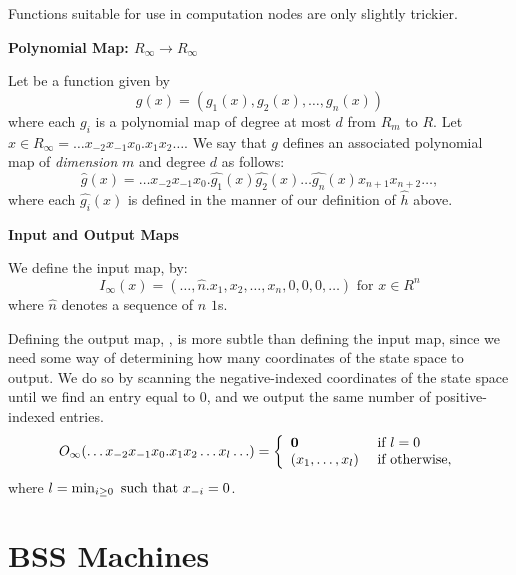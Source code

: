   Functions suitable for use in computation nodes are only slightly
  trickier.  
  
  \begin{definition}{\textbf{Polynomial Map: $R_\infty \rightarrow R_\infty$}}
    
    Let  be a function given by $$g(x) =
    (g_1(x), g_2(x), \ldots , g_n(x))$$ where each $g_i$ is a
    polynomial map of degree at most $d$ from $R_m$ to $R$.  Let $x
    \in R_\infty = \ldots x_{-2}x_{-1}x_0.x_1x_2 \ldots$. We say that
    $g$ defines an associated polynomial map
     of \emph{dimension} $m$
    and degree $d$ as follows:
    $$\widehat{g}(x) = 
    \ldots x_{-2}x_{-1}x_0.
    \widehat{g_1}(x)\widehat{g_2}(x)\ldots\widehat{g_n}(x)x_{n+1}x_{n+2}\ldots,$$
    where each $\widehat{g_i}(x)$ is defined in the manner of our
    definition of $\widehat{h}$ above.
  \end{definition}
  
  \begin{definition} \textbf{Input and Output Maps}
    \label{def:io-map}
    
    We define the input map, 
    by:
    $$I_\infty(x) = 
    (\ldots, \widehat{n}.x_1,x_2,\ldots,x_n, 0,0,0,\ldots) \text{ for }
    x \in R^n$$ where $\widehat{n}$ denotes a sequence of $n$ $1$s.
    
    Defining the output map, ,
    is more subtle than defining the input map, since we need some way
    of determining how many coordinates of the state space to output.
    We do so by scanning the negative-indexed coordinates of the state
    space until we find an entry equal to $0$, and we output the same
    number of positive-indexed entries.
    $$O_\infty(\ldots x_{-2}x_{-1}x_0.x_1x_2\ldots x_l \ldots ) = 
    \left\{ \begin{array}{ll} \mathbf{0} & \text{ if } l = 0 \\ (x_1, \ldots, x_l) & \text{ if } \text{otherwise}, \end{array} \right.
    $$
    where $l = \min_{i \geq 0} \text{ such that } x_{-i} = 0$.  
  \end{definition}

  \section{BSS Machines}

